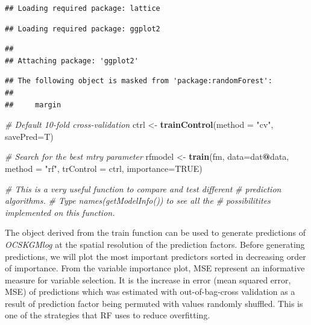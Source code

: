 \documentclass[10pt,b5paper,]{book}
\newenvironment{Shaded}{\begin{snugshade}}{\end{snugshade}}
\newcommand{\CommentTok}[1]{\textcolor[rgb]{0.56,0.35,0.01}{\textit{#1}}}
\newcommand{\DataTypeTok}[1]{\textcolor[rgb]{0.13,0.29,0.53}{#1}}
\newcommand{\KeywordTok}[1]{\textcolor[rgb]{0.13,0.29,0.53}{\textbf{#1}}}
\newcommand{\NormalTok}[1]{#1}
\newcommand{\OperatorTok}[1]{\textcolor[rgb]{0.81,0.36,0.00}{\textbf{#1}}}
\newcommand{\OtherTok}[1]{\textcolor[rgb]{0.56,0.35,0.01}{#1}}
\newcommand{\StringTok}[1]{\textcolor[rgb]{0.31,0.60,0.02}{#1}}
\theoremstyle{definition}
\theoremstyle{definition}
\theoremstyle{definition}
\theoremstyle{remark}
\begin{document}
\begin{verbatim}
## Loading required package: lattice
\end{verbatim}

\begin{verbatim}
## Loading required package: ggplot2
\end{verbatim}

\begin{verbatim}
## 
## Attaching package: 'ggplot2'
\end{verbatim}

\begin{verbatim}
## The following object is masked from 'package:randomForest':
## 
##     margin
\end{verbatim}

\begin{Shaded}
\begin{Highlighting}[]
\CommentTok{# Default 10-fold cross-validation}
\NormalTok{ctrl <-}\StringTok{ }\KeywordTok{trainControl}\NormalTok{(}\DataTypeTok{method =} \StringTok{"cv"}\NormalTok{, }\DataTypeTok{savePred=}\NormalTok{T)}

\CommentTok{# Search for the best mtry parameter}
\NormalTok{rfmodel <-}\StringTok{ }\KeywordTok{train}\NormalTok{(fm, }\DataTypeTok{data=}\NormalTok{dat}\OperatorTok{@}\NormalTok{data, }\DataTypeTok{method =} \StringTok{"rf"}\NormalTok{, }\DataTypeTok{trControl =}\NormalTok{ ctrl, }
             \DataTypeTok{importance=}\OtherTok{TRUE}\NormalTok{)}

\CommentTok{# This is a very useful function to compare and test different }
\CommentTok{# prediction algorithms.}
\CommentTok{# Type names(getModelInfo()) to see all the }
\CommentTok{# possibilitites implemented on this function.}
\end{Highlighting}
\end{Shaded}

The object derived from the train function can be used to generate
predictions of \emph{OCSKGMlog} at the spatial resolution of the
prediction factors. Before generating predictions, we will plot the most
important predictors sorted in decreasing order of importance. From the
variable importance plot, MSE represent an informative measure for
variable selection. It is the increase in error (mean squared error,
MSE) of predictions which was estimated with out-of-bag-cross validation
as a result of prediction factor being permuted with values randomly
shuffled. This is one of the strategies that RF uses to reduce
overfitting.
\end{document}
